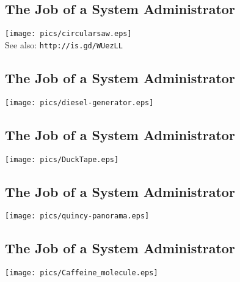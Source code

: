 \documentclass[xga]{xdvislides}
\begin{document}
\subsection{The Job of a System Administrator}
\vspace*{\fill}
\begin{center}
	\texttt{[image: pics/circularsaw.eps]} \\
	\small See also: {\tt http://is.gd/WUezLL} \Normalsize
\end{center}
\vspace*{\fill}

\subsection{The Job of a System Administrator}
\vspace*{\fill}
\begin{center}
	\texttt{[image: pics/diesel-generator.eps]} \\
\end{center}
\vspace*{\fill}

\subsection{The Job of a System Administrator}
\vspace*{\fill}
\begin{center}
	\texttt{[image: pics/DuckTape.eps]} \\
\end{center}
\vspace*{\fill}
\subsection{The Job of a System Administrator}
\vspace*{\fill}
\begin{center}
	\texttt{[image: pics/quincy-panorama.eps]} \\
\end{center}
\vspace*{\fill}

\subsection{The Job of a System Administrator}
\vspace*{\fill}
\begin{center}
	\texttt{[image: pics/Caffeine\_molecule.eps]} \\
\end{center}
\vspace*{\fill}
\end{document}
